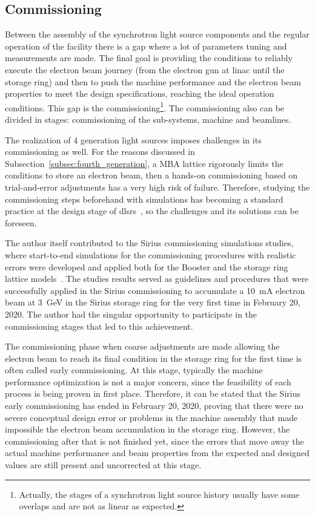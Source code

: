 \subsection{Commissioning}
Between the assembly of the synchrotron light source components and the regular operation of the facility there is a gap where a lot of parameters tuning and measurements are made. The final goal is providing the conditions to reliably execute the electron beam journey (from the electron gun at \gls{linac} until the storage ring) and then to push the machine performance and the electron beam properties to meet the design specifications, reaching the ideal operation conditions. This gap is the commissioning\footnote{Actually, the stages of a synchrotron light source history usually have some overlaps and are not as linear as expected.}. The commissioning also can be divided in stages: commissioning of the sub-systems, machine and beamlines.

The realization of 4 generation light sources imposes challenges in its commissioning as well. For the reasons discussed in Subsection~\ref{subsec:fourth_generation}, a MBA lattice rigorously limits the conditions to store an electron beam, then a hands-on commissioning based on trial-and-error adjustments has a very high risk of failure. Therefore, studying the commissioning steps beforehand with simulations has becoming a standard practice at the design stage of \glspl{dlsr}~\cite{sajaev2015, liuzzo2017, ghasem2019, sajaev2019, hellert2019}, so the challenges and its solutions can be foreseen. 

The author itself contributed to the Sirius commissioning simulations studies, where start-to-end simulations for the commissioning procedures with realistic errors were developed and applied both for the Booster and the storage ring lattice models~\cite{alves2019}. The studies results served as guidelines and procedures that were successfully applied in the Sirius commissioning to accumulate a \SI{10}{\milli\ampere} electron beam at \SI{3}{\giga\electronvolt} in the Sirius storage ring for the very first time in February 20, 2020. The author had the singular opportunity to participate in the commissioning stages that led to this achievement.

The commissioning phase when coarse adjustments are made allowing the electron beam to reach its final condition in the storage ring for the first time is often called early commissioning. At this stage, typically the machine performance optimization is not a major concern, since the feasibility of each process is being proven in first place. Therefore, it can be stated that the Sirius early commissioning has ended in February 20, 2020, proving that there were no severe conceptual design error or problems in the machine assembly that made impossible the electron beam accumulation in the storage ring. However, the commissioning after that is not finished yet, since the errors that move away the actual machine performance and beam properties from the expected and designed values are still present and uncorrected at this stage.

